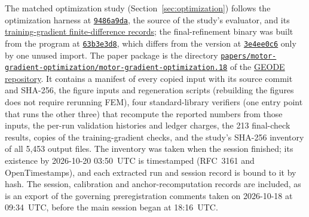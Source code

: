 \documentclass{anvil-paper}
\begin{document}
\begin{sloppypar}
The matched optimization study (Section~\ref{sec:optimization}) follows the
optimization harness at
\href{https://github.com/rjwalters/geode-fem/tree/9486a9da58beeca91968d4d3608f06b998abff45/benchmarks/motor_optimization}{\texttt{9486a9da}},
the source of the study's evaluator, and its
\href{https://github.com/rjwalters/geode-fem/tree/9486a9da58beeca91968d4d3608f06b998abff45/benchmarks/motor_optimization/runs}{training-gradient finite-difference records};
the final-refinement binary was built from the program at
\href{https://github.com/rjwalters/geode-fem/blob/63b3e3d8bbc30504f845eebb5b78e8be6a2ee12f/crates/geode-core/examples/icem_final_refinement.rs}{\texttt{63b3e3d8}},
which differs from the version at
\href{https://github.com/rjwalters/geode-fem/blob/3e4ee0c63a86dbf014a76c9faf04dd962da16911/crates/geode-core/examples/icem_final_refinement.rs}{\texttt{3e4ee0c6}}
only by one unused import.
The paper package is the directory
\href{https://github.com/rjwalters/geode-fem/tree/main/papers/motor-gradient-optimization/motor-gradient-optimization.18}{\texttt{papers/}\allowbreak\texttt{motor-gradient-optimization/}\allowbreak\texttt{motor-gradient-optimization.18}}
of the \href{https://github.com/rjwalters/geode-fem}{GEODE repository}. It
contains a manifest of every copied input with its source commit and
SHA-256, the figure inputs and regeneration scripts (rebuilding the figures
does not require rerunning FEM), four standard-library verifiers (one
entry point that runs the other three) that recompute the reported numbers
from those inputs, the per-run validation
histories and ledger charges, the 213 final-check results, copies of the
training-gradient checks, and the study's SHA-256 inventory of all 5,453
output files. The inventory was taken when the session finished; its
existence by 2026-10-20 03:50~UTC is timestamped (RFC~3161 and
OpenTimestamps), and each extracted run and session record is bound to it
by hash. The session, calibration and anchor-recomputation records are
included, as is an export of the governing preregistration comments taken
on 2026-10-18 at 09:34~UTC, before the main session began at 18:16~UTC.
\end{sloppypar}
\end{document}
